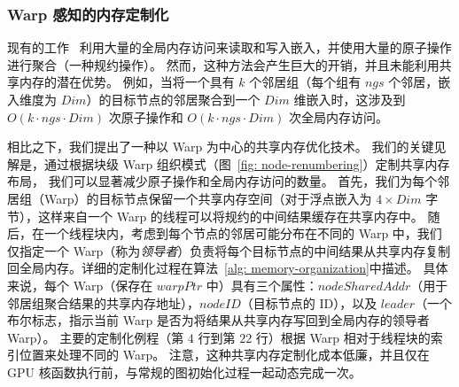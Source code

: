 \subsubsection{Warp 感知的内存定制化}
现有的工作~\cite{pyG, wang2016gunrock} 利用大量的全局内存访问来读取和写入嵌入，并使用大量的原子操作进行聚合（一种规约操作）。
然而，这种方法会产生巨大的开销，并且未能利用共享内存的潜在优势。
例如，当将一个具有 $k$ 个邻居组（每个组有 $ngs$ 个邻居，嵌入维度为 $Dim$）的目标节点的邻居聚合到一个 $Dim$ 维嵌入时，这涉及到 $O(k\cdot ngs\cdot Dim)$ 次原子操作和 $O(k\cdot ngs\cdot Dim)$ 次全局内存访问。

相比之下，我们提出了一种以 Warp 为中心的共享内存优化技术。
我们的关键见解是，通过根据块级 Warp 组织模式（图~\ref{fig: node-renumbering}）定制共享内存布局，
我们可以显著减少原子操作和全局内存访问的数量。
首先，我们为每个邻居组（Warp）的目标节点保留一个共享内存空间（对于浮点嵌入为 $4\times Dim$ 字节），这样来自一个 Warp 的线程可以将规约的中间结果缓存在共享内存中。
随后，在一个线程块内，考虑到每个节点的邻居可能分布在不同的 Warp 中，我们仅指定一个 Warp（称为\textit{领导者}）负责将每个目标节点的中间结果从共享内存复制回全局内存。详细的定制化过程在算法~\ref{alg: memory-organization}中描述。
具体来说，每个 Warp（保存在 $warpPtr$ 中）具有三个属性：$nodeSharedAddr$（用于邻居组聚合结果的共享内存地址），$nodeID$（目标节点的 ID），以及 $leader$（一个布尔标志，指示当前 Warp 是否为将结果从共享内存写回到全局内存的领导者 Warp）。
主要的定制化例程（第 $4$ 行到第 $22$ 行）根据 Warp 相对于线程块的索引位置来处理不同的 Warp。
注意，这种共享内存定制化成本低廉，并且仅在 GPU 核函数执行前，与常规的图初始化过程一起动态完成一次。

